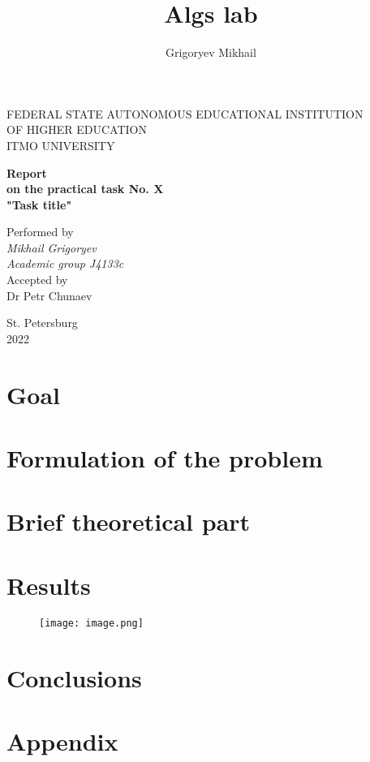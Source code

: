 \documentclass[12pt, a4paper]{article}
\author{Grigoryev Mikhail}
\title{Algs lab}
\begin{document}
\thispagestyle{empty}

\vspace{30mm}

\begin{center}
FEDERAL STATE AUTONOMOUS EDUCATIONAL INSTITUTION \\
OF HIGHER EDUCATION \\
ITMO UNIVERSITY

\vspace{40mm}

{\large \textbf{Report \\
on the practical task No. X \\
"Task title"}}
\end{center}

\vspace{15mm}

\begin{flushright}
{\large Performed by \\
\textit{Mikhail Grigoryev \\
Academic group J4133c \\}
Accepted by \\
Dr Petr Chunaev}
\end{flushright}

\vspace{100mm}

\begin{center}
St. Petersburg \\
2022
\end{center}

\newpage

\section*{Goal}

\section*{Formulation of the problem}

\section*{Brief theoretical part}

\section*{Results}

\begin{figure}[!h]
\centering
\texttt{[image: image.png]}
\end{figure}

\section*{Conclusions}

\section*{Appendix}
\end{document}
